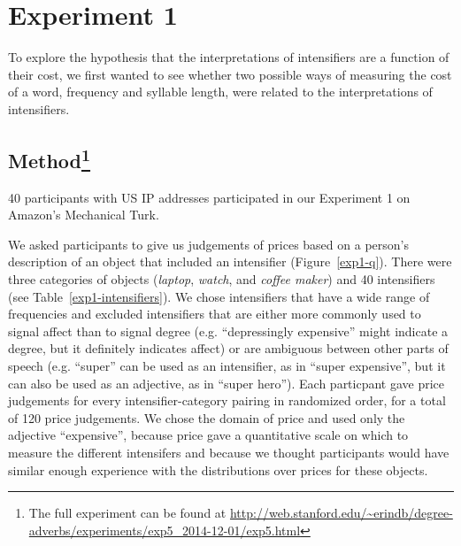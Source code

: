 \documentclass[10pt,letterpaper]{article}
\begin{document}
\section{Experiment 1}

To explore the hypothesis that the interpretations of intensifiers are a function of their cost, we first wanted to see whether two possible ways of measuring the cost of a word, frequency and syllable length, were related to the interpretations of intensifiers.


\subsection{Method\footnote{The full experiment can be found at \url{http://web.stanford.edu/~erindb/degree-adverbs/experiments/exp5_2014-12-01/exp5.html}}}

40 participants with US IP addresses participated in our Experiment 1 on Amazon's Mechanical Turk.

We asked participants to give us judgements of prices based on a person's description of an object that included an intensifier (Figure~\ref{exp1-q}).
There were three categories of objects (\emph{laptop}, \emph{watch}, and \emph{coffee maker}) and 40 intensifiers (see Table~\ref{exp1-intensifiers}).
We chose intensifiers that have a wide range of frequencies and excluded intensifiers that are either more commonly used to signal affect than to signal degree (e.g. ``depressingly expensive'' might indicate a degree, but it definitely indicates affect) or are ambiguous between other parts of speech (e.g. ``super'' can be used as an intensifier, as in ``super expensive'', but it can also be used as an adjective, as in ``super hero'').
Each particpant gave price judgements for every intensifier-category pairing in randomized order, for a total of 120 price judgements.
We chose the domain of price and used only the adjective ``expensive'', because price gave a quantitative scale on which to measure the different intensifers and because we thought participants would have similar enough experience with the distributions over prices for these objects.
\end{document}
